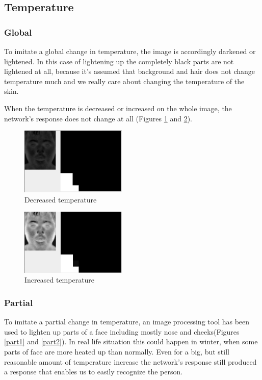 \documentclass[pdftex]{article}
\begin{document}
\subsection{Temperature}
\subsubsection{Global}
To imitate a global change in temperature, the image is accordingly darkened or lightened. In this case of lightening up the completely black parts are not lightened at all, because it's assumed that background and hair does not change temperature much and we really care about changing the temperature of the skin.

When the temperature is decreased or increased on the whole image, the network's response does not change at all (Figures \ref{chill} and \ref{heat}).
\begin{figure}[!htb]
	\centering
	\includegraphics[width=0.45\textwidth]{pictures/chill.png} 
	\caption{Decreased temperature}
	\label{chill}
\end{figure}
\begin{figure}[!htb]
	\centering
	\includegraphics[width=0.45\textwidth]{pictures/heat.png} 
	\caption{Increased temperature}
	\label{heat}
\end{figure}

\subsubsection{Partial}
To imitate a partial change in temperature, an image processing tool has been used to lighten up parts of a face including mostly nose and cheeks(Figures \ref{part1} and \ref{part2}). In real life situation this could happen in winter, when some parts of face are more heated up than normally. Even for a big, but still reasonable amount of temperature increase the network's response still produced a response that enables us to easily recognize the person.
\end{document}

